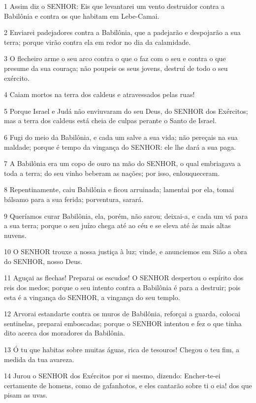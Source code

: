 \par 1 Assim diz o SENHOR: Eis que levantarei um vento destruidor contra a Babilônia e contra os que habitam em Lebe-Camai.
\par 2 Enviarei padejadores contra a Babilônia, que a padejarão e despojarão a sua terra; porque virão contra ela em redor no dia da calamidade.
\par 3 O flecheiro arme o seu arco contra o que o faz com o seu e contra o que presume da sua couraça; não poupeis os seus jovens, destruí de todo o seu exército.
\par 4 Caiam mortos na terra dos caldeus e atravessados pelas ruas!
\par 5 Porque Israel e Judá não enviuvaram do seu Deus, do SENHOR dos Exércitos; mas a terra dos caldeus está cheia de culpas perante o Santo de Israel.
\par 6 Fugi do meio da Babilônia, e cada um salve a sua vida; não pereçais na sua maldade; porque é tempo da vingança do SENHOR: ele lhe dará a sua paga.
\par 7 A Babilônia era um copo de ouro na mão do SENHOR, o qual embriagava a toda a terra; do seu vinho beberam as nações; por isso, enlouqueceram.
\par 8 Repentinamente, caiu Babilônia e ficou arruinada; lamentai por ela, tomai bálsamo para a sua ferida; porventura, sarará.
\par 9 Queríamos curar Babilônia, ela, porém, não sarou; deixai-a, e cada um vá para a sua terra; porque o seu juízo chega até ao céu e se eleva até às mais altas nuvens.
\par 10 O SENHOR trouxe a nossa justiça à luz; vinde, e anunciemos em Sião a obra do SENHOR, nosso Deus.
\par 11 Aguçai as flechas! Preparai os escudos! O SENHOR despertou o espírito dos reis dos medos; porque o seu intento contra a Babilônia é para a destruir; pois esta é a vingança do SENHOR, a vingança do seu templo.
\par 12 Arvorai estandarte contra os muros de Babilônia, reforçai a guarda, colocai sentinelas, preparai emboscadas; porque o SENHOR intentou e fez o que tinha dito acerca dos moradores da Babilônia.
\par 13 Ó tu que habitas sobre muitas águas, rica de tesouros! Chegou o teu fim, a medida da tua avareza.
\par 14 Jurou o SENHOR dos Exércitos por si mesmo, dizendo: Encher-te-ei certamente de homens, como de gafanhotos, e eles cantarão sobre ti o eia! dos que pisam as uvas.

